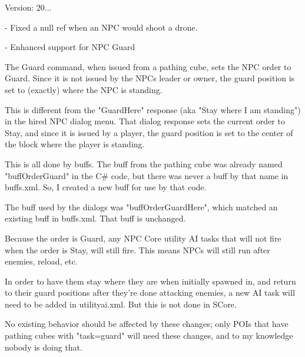  Version\+: 20... \begin{DoxyVerb}
        - Fixed a null ref when an NPC would shoot a drone.

        - Enhanced support for NPC Guard

        The Guard command, when issued from a pathing cube, sets the NPC order to Guard. Since it is not issued by the NPCs leader or owner, the guard position is set to (exactly) where the NPC is standing.

        This is different from the "GuardHere" response (aka "Stay where I am standing") in the hired NPC dialog menu. That dialog response sets the current order to Stay, and since it is issued by a player, 
            the guard position is set to the center of the block where the player is standing.

        This is all done by buffs. The buff from the pathing cube was already named "buffOrderGuard" in the C# code, but there was never a buff by that name in buffs.xml. So, I created a new buff for use by that code.

        The buff used by the dialogs was "buffOrderGuardHere", which matched an existing buff in buffs.xml. That buff is unchanged.

        Because the order is Guard, any NPC Core utility AI tasks that will not fire when the order is Stay, will still fire. This means NPCs will still run after enemies, reload, etc.

        In order to have them stay where they are when initially spawned in, and return to their guard positions after they're done attacking enemies, a new AI task will need to be 
            added in utilityai.xml. But this is not done in SCore.

        No existing behavior should be affected by these changes; only POIs that have pathing cubes with "task=guard" will need these changes, and to my knowledge nobody is doing that.
\end{DoxyVerb}


